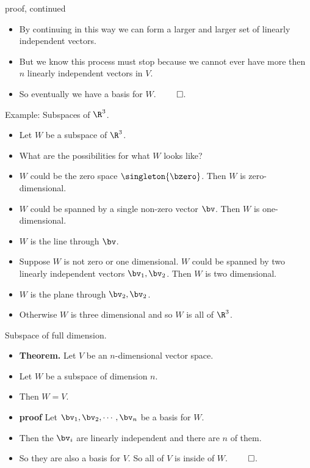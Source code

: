 \documentclass{beamer}
\begin{document}
\begin{frame}{proof, continued}

\begin{itemize}
\item By continuing in this way we can form a larger and larger set of linearly independent vectors.
\item But we know this process must stop because we cannot ever have more then $n$ linearly independent vectors in $V$.
\item So eventually we have a basis for $W$. $\qed$.
\end{itemize}

\end{frame}

\begin{frame}{Example: Subspaces of $\R^3$.}


\begin{itemize}
\item Let $W$ be a subspace of $\R^3$.
\item What are the possibilities for what $W$ looks like?
\item $W$ could be the zero space $\singleton{\bzero}$. Then $W$ is zero-dimensional.
\item $W$ could be spanned by a single non-zero vector $\bv$. Then $W$ is one-dimensional.
\item $W$ is the line through $\bv$.
\item Suppose $W$ is not zero or one dimensional. $W$ could be spanned by two linearly independent vectors $\bv_1,\bv_2$. Then $W$ is two dimensional.
\item $W$ is the plane through $\bv_2,\bv_2$.
\item Otherwise $W$ is three dimensional and so $W$ is all of $\R^3$.
\end{itemize}

\end{frame}

\begin{frame}{Subspace of full dimension.}

\begin{itemize}
\item \textbf{Theorem.} Let $V$ be an $n$-dimensional vector space.
\item Let $W$ be a subspace of dimension $n$.
\item Then $W=V$.
\item \textbf{proof} Let $\bv_1,\bv_2,\cdots,\bv_n$ be a basis for $W$.
\item Then the $\bv_i$ are linearly independent and there are $n$ of them.
\item So they are also a basis for $V$. So all of $V$ is inside of $W$. $\qed$.
\end{itemize}

\end{frame}

\end{document}
